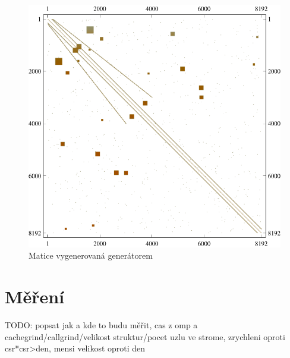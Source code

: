 
\begin{figure}[htb]
	\includegraphics[width=1.0\textwidth]{./images/generated_matrix}
	\caption{Matice vygenerovaná generátorem}
	\label{fig:generatedMtx}
\end{figure}







\section{Měření}

TODO: popsat jak a kde to budu měřit, cas z omp a cachegrind/callgrind/velikost struktur/pocet uzlu ve strome, zrychleni oproti csr*csr>den, mensi velikost oproti den